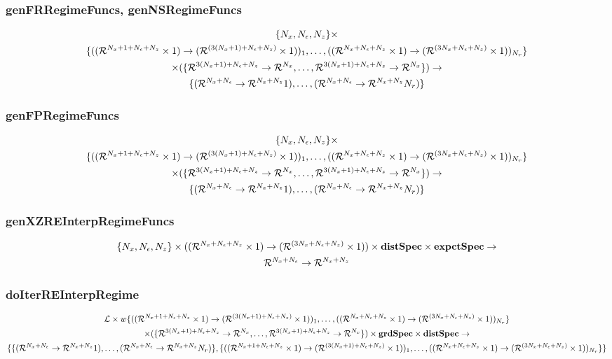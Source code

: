 \documentclass[tikz]{beamer}
\begin{document}
\begin{frame}
\frametitle{genFRRegimeFuncs, genNSRegimeFuncs}
\label{sec:genfrregimefunc}



{\small
\begin{gather*}
\{\numX,\numEps,\numZ\}\times\\
\{(\lilXRegimeFuncSig)_1,\ldots,(\lilXFuncSig)_{\numR}\}  \\
 \times (\eqnRegimeFuncSig )\rightarrow\\
\frfpnsRegimeFuncSig
\end{gather*}
}








\end{frame}
\begin{frame}
\frametitle{genFPRegimeFuncs}
\label{sec:genfpregimefunc}




{\small
\begin{gather*}
\{\numX,\numEps,\numZ\}\times\\
\{(\lilXRegimeFuncSig)_1,\ldots,(\lilXFuncSig)_{\numR}\}  \\
 \times (\eqnRegimeFuncSig )\rightarrow\\
\frfpnsRegimeFuncSig
\end{gather*}
}




\end{frame}
\begin{frame}
\frametitle{genXZREInterpRegimeFuncs}
\label{sec:genfpfunc}
\begin{gather*}
\{\numX,\numEps,\numZ\}\times(\lilXFuncSig)\times \dstSpec \times  \expctSpec   \rightarrow\\
\frfpnsFuncSig
\end{gather*}



\end{frame}
\begin{frame}
\frametitle{doIterREInterpRegime}
\label{sec:doiterreinterp}

\begin{gather*}
  \linMod \times 
w\{(\lilXRegimeFuncSig)_1,\ldots,(\lilXFuncSig)_{\numR}\}  \\
 \times (\eqnRegimeFuncSig ) \times \grdSpec \times \dstSpec \rightarrow\\
\{\frfpnsRegimeFuncSig, \{(\lilXRegimeFuncSig)_1,\ldots,(\lilXFuncSig)_{\numR}\}\}
\end{gather*}



\end{frame}
\end{document}
